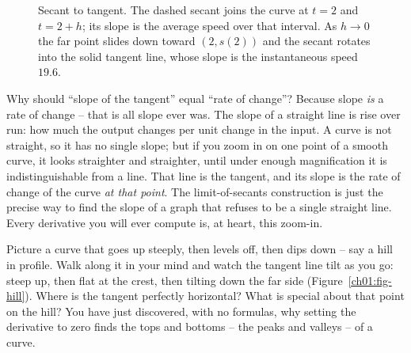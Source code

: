 \begin{figure}[H]
\centering
{}
\caption{Secant to tangent. The dashed secant joins the curve at $t=2$ and
$t=2+h$; its slope is the average speed over that interval. As $h\to 0$ the far
point slides down toward $(2,s(2))$ and the secant rotates into the solid
tangent line, whose slope is the instantaneous speed $19.6$.}
\label{ch01:fig-secant-tangent}
\end{figure}

\begin{whybox}
Why should ``slope of the tangent'' equal ``rate of change''? Because slope
\emph{is} a rate of change -- that is all slope ever was. The slope of a straight
line is rise over run: how much the output changes per unit change in the input.
A curve is not straight, so it has no single slope; but if you zoom in on one
point of a smooth curve, it looks straighter and straighter, until under enough
magnification it is indistinguishable from a line. That line is the tangent, and
its slope is the rate of change of the curve \emph{at that point}. The
limit-of-secants construction is just the precise way to find the slope of a
graph that refuses to be a single straight line. Every derivative you will ever
compute is, at heart, this zoom-in.
\end{whybox}

\begin{walkbox}
Picture a curve that goes up steeply, then levels off, then dips down -- say a
hill in profile. Walk along it in your mind and watch the tangent line tilt as
you go: steep up, then flat at the crest, then tilting down the far side
(Figure~\ref{ch01:fig-hill}). Where is the tangent perfectly horizontal? What is
special about that point on the hill? You have just discovered, with no formulas,
why setting the derivative to zero finds the tops and bottoms -- the peaks and
valleys -- of a curve.
\end{walkbox}

